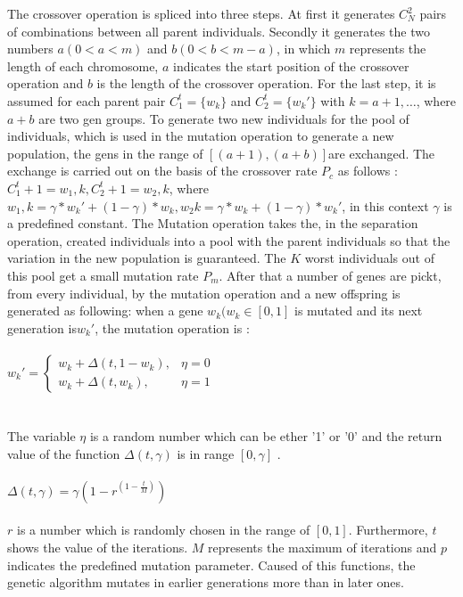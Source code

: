 \documentclass[../masterarbeit.tex]{subfiles}
\begin{document}
The crossover operation is spliced into three steps. At first it generates \(C_N^2\) pairs of combinations between all parent individuals. 
Secondly it generates the two numbers \(a(0 < a < m)\) and \(b(0 < b < m − a)\), in which \(m\) represents the length of each chromosome, \(a\) indicates the start position of the crossover operation and \(b\) is the length of the crossover operation. 
For the last step, it is assumed for each parent pair \(C_1^t = \{w_k\}\) and \(C_2^t = \{w_k'\}\) with \( k = a + 1, …\), where \(a + b \) are two gen groups. To generate two new individuals for the pool of individuals, which is used in the mutation operation to generate a new population, the gens in the range of \([(a + 1), (a + b)]\)are exchanged. The exchange is carried out on the basis of the crossover rate \(P_c\) as follows \textcite[]{LU2008887}: \newline
\(C_1^t+1 = {w_1,k}, C_2^t+1 = {w_2,k} \), where \(w_1,k = \gamma * w_k' + (1 - \gamma) * w_k, w_2k = \gamma * w_k + (1 - \gamma) * w_k' \), in this context \(\gamma \) is a predefined constant.
The Mutation operation takes the, in the separation operation, created individuals into a pool with the parent individuals so that the variation in the new population is guaranteed. The \(K\) worst individuals out of this pool get a small mutation rate \(P_m\). After that a number of genes are pickt, from every individual, by the mutation operation and a new offspring is generated as following: when a gene \(w_k(w_k \in [0,1] \) is mutated and its next generation is\(w_k'\), the mutation operation is \textcite[]{LU2008887}: \\~\\
\( w_k' =
  \begin{cases}
    w_k + \Delta(t, 1 - w_k), & \eta = 0\\
    w_k + \Delta(t, w_k), & \eta = 1 
  \end{cases}
 \) \hfill \textcite[]{LU2008887} \\~\\~\\
 The variable \(\eta\) is a random number which can be ether '1' or '0' and the return value of the function \(\Delta(t, \gamma)\) is in range \([0, \gamma]\) \textcite[]{LU2008887}.\\~\\
\(\Delta(t, \gamma) = \gamma (1 - r^{(1-\frac{t}{M})})\) \hfill \textcite[]{LU2008887} \\~\\
\(r\) is a number which is randomly chosen in the range of \([0,1]\). Furthermore, \(t\) shows the value of the iterations. \(M\) represents the maximum of iterations and \(p\) indicates the predefined mutation parameter. Caused of this functions, the genetic algorithm mutates in earlier generations more than in later ones. \autocite[]{LU2008887} \newline
\end{document}
